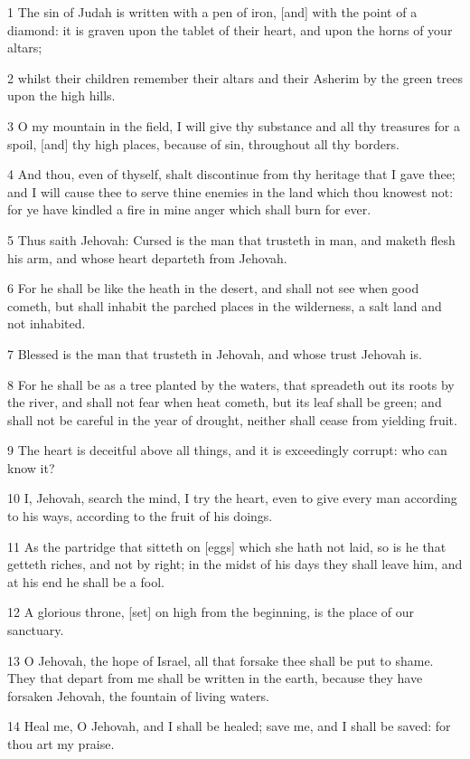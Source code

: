 \par 1 The sin of Judah is written with a pen of iron, [and] with the point of a diamond: it is graven upon the tablet of their heart, and upon the horns of your altars;
\par 2 whilst their children remember their altars and their Asherim by the green trees upon the high hills.
\par 3 O my mountain in the field, I will give thy substance and all thy treasures for a spoil, [and] thy high places, because of sin, throughout all thy borders.
\par 4 And thou, even of thyself, shalt discontinue from thy heritage that I gave thee; and I will cause thee to serve thine enemies in the land which thou knowest not: for ye have kindled a fire in mine anger which shall burn for ever.
\par 5 Thus saith Jehovah: Cursed is the man that trusteth in man, and maketh flesh his arm, and whose heart departeth from Jehovah.
\par 6 For he shall be like the heath in the desert, and shall not see when good cometh, but shall inhabit the parched places in the wilderness, a salt land and not inhabited.
\par 7 Blessed is the man that trusteth in Jehovah, and whose trust Jehovah is.
\par 8 For he shall be as a tree planted by the waters, that spreadeth out its roots by the river, and shall not fear when heat cometh, but its leaf shall be green; and shall not be careful in the year of drought, neither shall cease from yielding fruit.
\par 9 The heart is deceitful above all things, and it is exceedingly corrupt: who can know it?
\par 10 I, Jehovah, search the mind, I try the heart, even to give every man according to his ways, according to the fruit of his doings.
\par 11 As the partridge that sitteth on [eggs] which she hath not laid, so is he that getteth riches, and not by right; in the midst of his days they shall leave him, and at his end he shall be a fool.
\par 12 A glorious throne, [set] on high from the beginning, is the place of our sanctuary.
\par 13 O Jehovah, the hope of Israel, all that forsake thee shall be put to shame. They that depart from me shall be written in the earth, because they have forsaken Jehovah, the fountain of living waters.
\par 14 Heal me, O Jehovah, and I shall be healed; save me, and I shall be saved: for thou art my praise.
